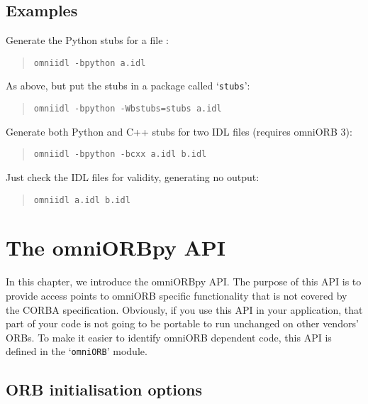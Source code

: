 \documentclass[11pt,twoside,a4paper]{book}
\newcommand{\module}[1]{\texttt{#1}}
\newcommand{\cmdline}[1]{\texttt{#1}}
\newcommand{\file}{\begingroup \urlstyle{tt}\Url}
\begin{document}
\section{Examples}

Generate the Python stubs for a file \file{a.idl}:

\begin{quote}
\cmdline{omniidl -bpython a.idl}
\end{quote}

\noindent As above, but put the stubs in a package called
`\module{stubs}':

\begin{quote}
\cmdline{omniidl -bpython -Wbstubs=stubs a.idl}
\end{quote}

\noindent Generate both Python and C++ stubs for two IDL files
(requires omniORB 3):

\begin{quote}
\cmdline{omniidl -bpython -bcxx a.idl b.idl}
\end{quote}

\noindent Just check the IDL files for validity, generating no output:

\begin{quote}
\cmdline{omniidl a.idl b.idl}
\end{quote}




\chapter{The omniORBpy API}
\label{omniORBapi}

In this chapter, we introduce the omniORBpy API. The purpose of this
API is to provide access points to omniORB specific functionality that
is not covered by the CORBA specification.  Obviously, if you use this
API in your application, that part of your code is not going to be
portable to run unchanged on other vendors' ORBs. To make it easier to
identify omniORB dependent code, this API is defined in the
`\module{omniORB}' module.



\section{ORB initialisation options}
\label{omniorbapioptions}\label{sec:ORBargs}
\end{document}
